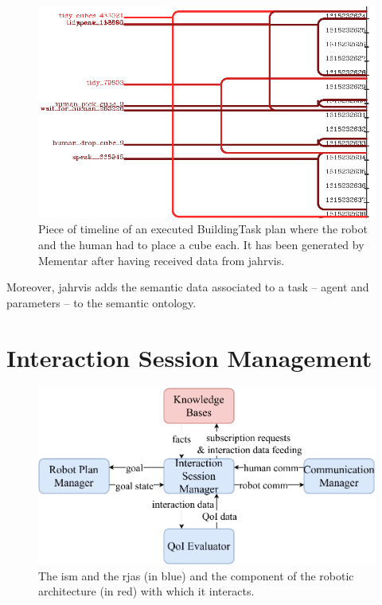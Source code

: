\documentclass[a4paper,11pt,twoside]{StyleThese}
\begin{document}
\begin{figure}[!ht]
	\includegraphics[width=\linewidth]{figures/chapter2/timeline.png}
	\caption{Piece of timeline of an executed BuildingTask plan where the robot and the human had to place a cube each. It has been generated by Mementar after having received data from \acrshort{jahrvis}.}
	\label{chap6:fig:timeline}
\end{figure}

Moreover, \acrshort{jahrvis} adds the semantic data associated to a task -- agent and parameters -- to the semantic ontology.
\thispagestyle{example}

\section{Interaction Session Management} 

\begin{figure}[!htb]
	\centering
	\includegraphics[width=0.7\linewidth]{figures/chapter2/session_manager_zoom.pdf}
	\caption{The \acrlong{ism} and the \acrshort{rja}s (in blue) and the component of the robotic architecture (in red) with which it interacts.}
	\label{chap6:fig:session_manager_zoom}
\end{figure}
\end{document}
